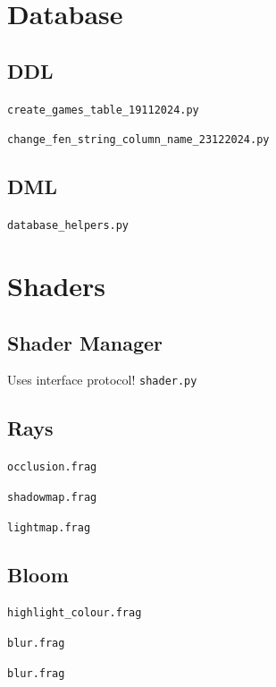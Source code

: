 \documentclass[../main/main.tex]{subfiles}
\begin{document}
\section{Database}
\subsection{DDL}
\noindent\verb|create_games_table_19112024.py|


\bigskip
\noindent\verb|change_fen_string_column_name_23122024.py|


\subsection{DML}
\noindent\verb|database_helpers.py|


\section{Shaders}
\subsection{Shader Manager}
Uses interface protocol!
\noindent\verb|shader.py|


\subsection{Rays}
\noindent\verb|occlusion.frag|


\bigskip
\noindent\verb|shadowmap.frag|


\bigskip
\noindent\verb|lightmap.frag|


\subsection{Bloom}
\noindent\verb|highlight_colour.frag|


\noindent\verb|blur.frag|


\bigskip
\noindent\verb|blur.frag|

\end{document}
